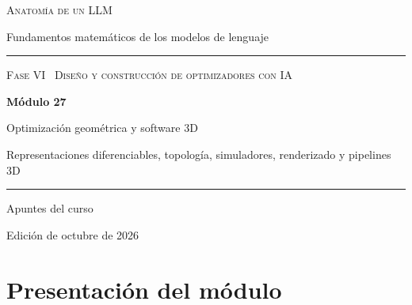 \documentclass[11pt,a4paper,twoside,openany]{book}
\begin{document}
\frontmatter
\begin{titlepage}
\centering
\vspace*{2.5cm}
{\large\scshape Anatomía de un LLM}\par
\vspace{0.4cm}
{\normalsize Fundamentos matemáticos de los modelos de lenguaje}\par
\vspace{2.2cm}
\rule{\textwidth}{0.8pt}\par\vspace{0.5cm}
{\small\scshape Fase VI \textperiodcentered\ Diseño y construcción de optimizadores con IA}\par\vspace{0.3cm}
{\Huge\bfseries Módulo 27\par}\vspace{0.3cm}
{\LARGE Optimización geométrica y software 3D\par}
\vspace{0.2cm}
{\large Representaciones diferenciables, topología, simuladores, renderizado y pipelines 3D\par}
\vspace{0.5cm}\rule{\textwidth}{0.4pt}\par
\vspace{1.6cm}
{\large Apuntes del curso}\par
\vfill
{\small Edición de octubre de 2026}\par
\end{titlepage}

\chapter*{Presentación del módulo}
\end{document}
